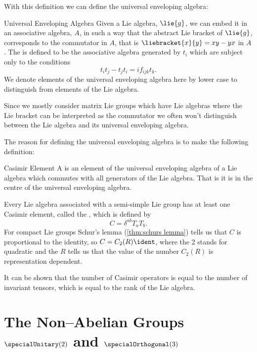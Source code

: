 With this definition we can define the universal enveloping algebra:
\begin{dfn}{Universal Enveloping Algebra}{}
    Given a Lie algebra, \(\lie{g}\), we can embed it in an associative algebra, \(A\), in such a way that the abstract Lie bracket of \(\lie{g}\), corresponds to the commutator in \(A\), that is \(\liebracket{x}{y} = xy - yx\) in \(A\).
    The  is defined to be the associative algebra generated by \(t_i\) which are subject only to the conditions
    \begin{equation}
        t_it_j - t_jt_i = if_{ijk}t_k.
    \end{equation}
    We denote elements of the universal enveloping algebra here by lower case to distinguish from elements of the Lie algebra.
\end{dfn}
Since we mostly consider matrix Lie groups which have Lie algebras where the Lie bracket can be interpreted as the commutator we often won't distinguish between the Lie algebra and its universal enveloping algebra.

The reason for defining the universal enveloping algebra is to make the following definition:
\begin{dfn}{Casimir Element}{}
    A  is an element of the universal enveloping algebra of a Lie algebra which commutes with all generators of the Lie algebra.
    That is it is in the centre of the universal enveloping algebra.
\end{dfn}
Every Lie algebra associated with a semi-simple Lie group has at least one Casimir element, called the , which is defined by
\begin{equation}
    C = \delta^{ab}T_aT_b.
\end{equation}
For compact Lie groups Schur's lemma (\cref{thm:schurs lemma}) tells us that \(C\) is proportional to the identity, so \(C = C_2(R)\ident\), where the 2 stands for quadratic and the \(R\) tells us that the value of the number \(C_2(R)\) is representation dependent.

It can be shown that the number of Casimir operators is equal to the number of invariant tensors, which is equal to the rank of the Lie algebra.

\section{The Non--Abelian Groups \texorpdfstring{\(\specialUnitary(2)\)}{SU(2)} and \texorpdfstring{\(\specialOrthogonal(3)\)}{SO(3)}}
